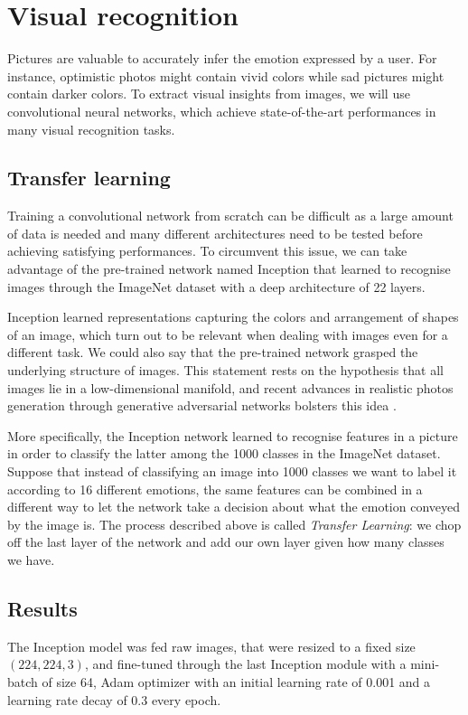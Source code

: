 \documentclass{article} %
\begin{document}
\section{Visual recognition}
Pictures are valuable to accurately infer the emotion expressed by a user. For instance, optimistic photos might contain vivid colors while sad pictures might contain darker colors. To extract visual insights from images, we will use convolutional neural networks, which achieve state-of-the-art performances in many visual recognition tasks.

\subsection{Transfer learning}
Training a convolutional network from scratch can be difficult as a large amount of data is needed and many different architectures need to be tested before achieving satisfying performances. To circumvent this issue, we can take advantage of the pre-trained network named Inception that learned to recognise images through the ImageNet dataset with a deep architecture of 22 layers.

Inception learned representations capturing the colors and arrangement of shapes of an image, which turn out to be relevant when dealing with images even for a different task. We could also say that the pre-trained network grasped the underlying structure of images. This statement rests on the hypothesis that all images lie in a low-dimensional manifold, and recent advances in realistic photos generation through generative adversarial networks bolsters this idea \citep{Radford-16}. 

More specifically, the Inception network learned to recognise features in a picture in order to classify the latter among the 1000 classes in the ImageNet dataset. Suppose that instead of classifying an image into 1000 classes we want to label it according to 16 different emotions, the same features can be combined in a different way to let the network take a decision about what the emotion conveyed by the image is. The process described above is called {\em Transfer Learning}: we chop off the last layer of the network and add our own layer given how many classes we have.

\subsection{Results}
The Inception model was fed raw images, that were resized to a fixed size $(224, 224, 3)$, and fine-tuned through the last Inception module \citep{Szegedy-15} with a mini-batch of size 64, Adam optimizer with an initial learning rate of 0.001 and a learning rate decay of 0.3 every epoch.
\end{document}
